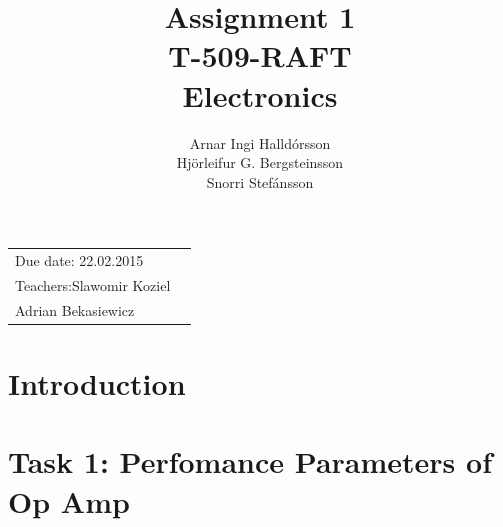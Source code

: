\documentclass[11pt,a4paper]{article}
\title{Assignment 1 \\ T-509-RAFT \\ Electronics} %
\author{Arnar Ingi Halldórsson \\ Hjörleifur G. Bergsteinsson \\ Snorri Stefánsson} %
\begin{document}
\maketitle %

\begin{tabular}{lr}
Due date: 22.02.2015 \\
Teachers:\qquad Slawomir Koziel\\ %
\qquad \qquad \qquad Adrian Bekasiewicz
\end{tabular}

\setlength\parindent{0pt} %

\renewcommand{\labelenumi}{\alph{enumi}.} %

\section*{Introduction}


\section*{Task 1: Perfomance Parameters of Op Amp}
\end{document}
